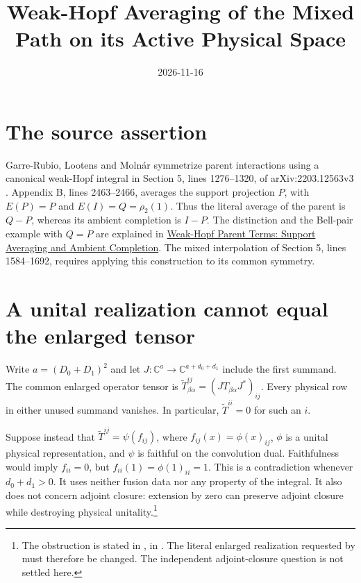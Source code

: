 \documentclass{article}
\title{Weak-Hopf Averaging of the Mixed Path on its Active Physical Space}
\author{}
\date{2026-11-16}
\begin{document}
\maketitle
{}

\section{The source assertion}
Garre-Rubio, Lootens and Moln\'ar symmetrize parent interactions using a
canonical weak-Hopf integral in Section 5, lines 1276--1320, of
arXiv:2203.12563v3 \cite[Section~5]{GarreRubio2023MPOSym}.
Appendix B, lines 2463--2466, averages the support projection $P$, with
$E(P)=P$ and $E(I)=Q=\rho_2(1)$. Thus the literal average of the parent
is $Q-P$, whereas its ambient completion is $I-P$.
The distinction and the Bell-pair example with $Q=P$ are explained in
\href{https://sirui-lu.com/TNLean/paper-gaps/glm23_wha_parent_completion.pdf}
{Weak-Hopf Parent Terms: Support Averaging and Ambient Completion}.
The mixed interpolation of Section 5, lines 1584--1692, requires applying
this construction to its common symmetry.

\section{A unital realization cannot equal the enlarged tensor}
Write $a=(D_0+D_1)^2$ and let
$J:\mathbb C^a\longrightarrow\mathbb C^{a+d_0+d_1}$ include the first
summand. The common enlarged operator tensor is
$\widetilde T^{ij}_{\beta\alpha}=(J T_{\beta\alpha}J^*)_{ij}$.
Every physical row in either unused summand vanishes. In particular,
$\widetilde T^{ii}=0$ for such an $i$.

Suppose instead that $\widetilde T^{ij}=\psi(f_{ij})$, where
$f_{ij}(x)=\phi(x)_{ij}$, $\phi$ is a unital physical representation,
and $\psi$ is faithful on the convolution dual. Faithfulness would imply
$f_{ii}=0$, but $f_{ii}(1)=\phi(1)_{ii}=1$. This is a contradiction whenever
$d_0+d_1>0$. It uses neither fusion data nor any property of the integral.
It also does not concern adjoint closure: extension by zero can preserve
adjoint closure while destroying physical unitality.\footnote{
    The obstruction is stated in
    ,
    in .
    The literal enlarged realization requested by  must therefore
    be changed. The independent adjoint-closure question  is not
    settled here.}
\end{document}
